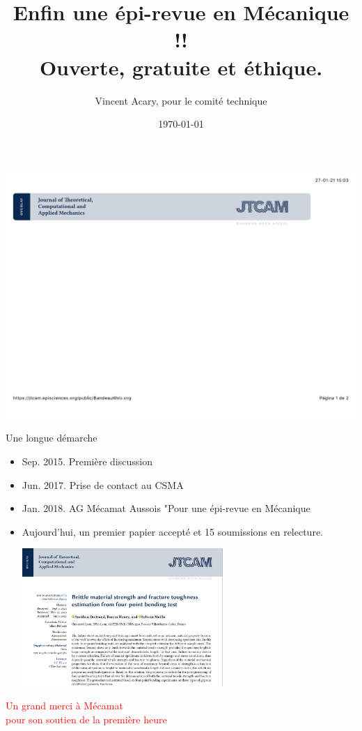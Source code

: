 \documentclass[8pt,red, compress]{beamer}
\title[Enfin une épi-revue en Mécanique]{{\huge Enfin une épi-revue en Mécanique !!}\\[2mm]
  Ouverte, gratuite  et éthique.}
\author{Vincent Acary, pour le comité technique}
\date{\today}
\newcommand{\tr}[1]{\textcolor{red}{#1}}
\begin{document}
{
  \begin{frame}
    \begin{center}
     \includegraphics[width=1.0\textwidth]{BandeauWeb.pdf}
   \end{center}
    \titlepage
  \end{frame}
}
\begin{frame}
  \begin{block}{Une longue démarche}
  \begin{itemize}
  \item Sep. 2015. Première discussion
  \item Jun. 2017. Prise de contact au CSMA
  \item Jan. 2018. AG Mécamat Aussois "Pour une épi-revue en Mécanique
  \item Aujourd'hui, un premier papier accepté et 15 soumissions en relecture.
    \begin{center}
    \includegraphics[width=0.6\textwidth]{first_paper.png}
  \end{center}
  \end{itemize}
\end{block}
\begin{center}
\Huge{\tr{Un grand merci à Mécamat \\
    pour son soutien de la première heure}}
\end{center}
\end{frame}
\end{document}
